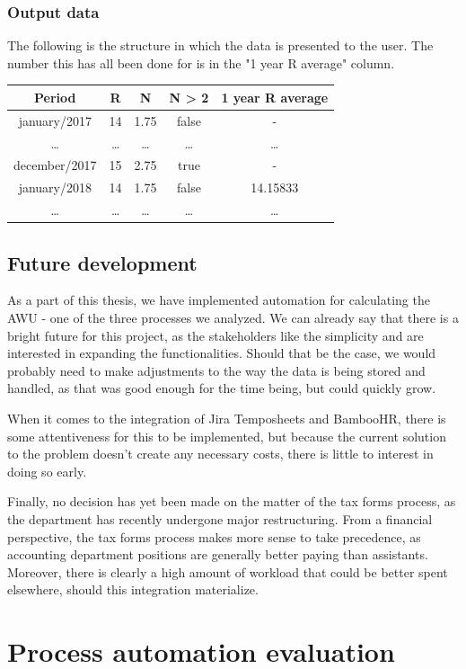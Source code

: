 \documentclass[12pt,oneside]{fithesis2}
\begin{document}
\subsection{Output data}
The following is the structure in which the data is presented to the user. The number this has all been done for is in the "1 year R average" column.
\begin{center}
\begin{tabular}{ |c|c|c|c|c| } 
\hline
Period & R & N & N > 2 & 1 year R average \\
\hline
january/2017 & 14 & 1.75 & false & - \\
\dots & \dots & \dots & \dots & \dots \\
december/2017 & 15 & 2.75 & true & - \\
january/2018 & 14 & 1.75 & false & 14.15833 \\
\dots & \dots & \dots & \dots & \dots \\
\hline
\end{tabular}
\end{center}
\section{Future development}
As a part of this thesis, we have implemented automation for calculating the AWU - one of the three processes we analyzed. We can already say that there is a bright future for this project, as the stakeholders like the simplicity and are interested in expanding the functionalities. Should that be the case, we would probably need to make adjustments to the way the data is being stored and handled, as that was good enough for the time being, but could quickly grow.

When it comes to the integration of Jira Temposheets and BambooHR, there is some attentiveness for this to be implemented, but because the current solution to the problem doesn't create any necessary costs, there is little to interest in doing so early.

Finally, no decision has yet been made on the matter of the tax forms process, as the department has recently undergone major restructuring. From a financial perspective, the tax forms process makes more sense to take precedence, as accounting department positions are generally better paying than assistants. Moreover, there is clearly a high amount of workload that could be better spent elsewhere, should this integration materialize.
\chapter{Process automation evaluation}
\end{document}
